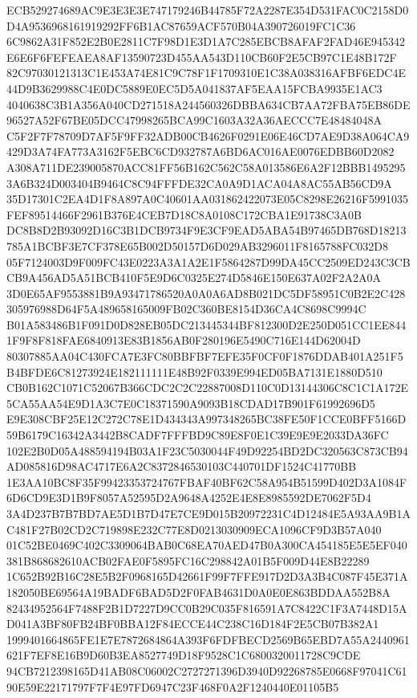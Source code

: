 \documentclass[UTF8,fontset=fandol,zihao=-4,a4paper]{ctexart}
\begin{document}
{{ECB529274689AC9E3E3E3E747179246B44785F72A2287E354D531FAC0C2158D0D4A9536968161919292FF6B1AC87659ACF570B04A390726019FC1C36
6C9862A31F852E2B0E2811C7F98D1E3D1A7C285EBCB8AFAF2FAD46E945342E6E6F6FEFEAEA8AF13590723D455AA543D110CB60F2E5CB97C1E48B172F
82C97030121313C1E453A74E81C9C78F1F1709310E1C38A038316AFBF6EDC4E44D9B3629988C4E0DC5889E0EC5D5A041837AF5EAA15FCBA9935E1AC3
4040638C3B1A356A040CD271518A244560326DBBA634CB7AA72FBA75EB86DE96527A52F67BE05DCC47998265BCA99C1603A32A36AECCC7E48484048A
C5F2F7F78709D7AF5F9FF32ADB00CB4626F0291E06E46CD7AE9D38A064CA9429D3A74FA773A3162F5EBC6CD932787A6BD6AC016AE0076EDBB60D2082
A308A711DE239005870ACC81FF56B162C562C58A013586E6A2F12BBB14952953A6B324D003404B9464C8C94FFFDE32CA0A9D1ACA04A8AC55AB56CD9A
35D17301C2EA4D1F8A897A0C40601AA031862422073E05C8298E26216F5991035FEF89514466F2961B376E4CEB7D18C8A0108C172CBA1E91738C3A0B
DC8B8D2B93092D16C3B1DCB9734F9E3CF9EAD5ABA54B97465DB768D18213785A1BCBF3E7CF378E65B002D50157D6D029AB3296011F8165788FC032D8
05F7124003D9F009FC43E0223A3A1A2E1F5864287D99DA45CC2509ED243C3CBCB9A456AD5A51BCB410F5E9D6C0325E274D5846E150E637A02F2A2A0A
3D0E65AF9553881B9A93471786520A0A0A6AD8B021DC5DF58951C0B2E2C428305976988D64F5A489658165009FB02C360BE8154D36CA4C8698C9994C
B01A583486B1F091D0D828EB05DC213445344BF812300D2E250D051CC1EE8441F9F8F818FAE6840913E83B1856AB0F280196E5490C716E144D62004D
80307885AA04C430FCA7E3FC80BBFBF7EFE35F0CF0F1876DDAB401A251F5B4BFDE6C81273924E182111111E48B92F0339E994ED05BA7131E1880D510
CB0B162C1071C52067B366CDC2C2C22887008D110C0D13144306C8C1C1A172E5CA55AA54E9D1A3C7E0C18371590A9093B18CDAD17B901F61992696D5
E9E308CBF25E12C272C78E1D434343A997348265BC38FE50F1CCE0BFF5166D59B6179C16342A3442B8CADF7FFFBD9C89E8F0E1C39E9E9E2033DA36FC
102E2B0D05A488594194B03A1F23C5030044F49D92254BD2DC320563C873CB94AD085816D98AC4717E6A2C8372846530103C440701DF1524C41770BB
1E3AA10BC8F35F99423353724767FBAF40BF62C58A954B51599D402D3A1084F6D6CD9E3D1B9F8057A52595D2A9648A4252E4E8E8985592DE7062F5D4
3A4D237B7B7BD7AE5D1B7D47E7CE9D015B20972231C4D12484E5A93AA9B1AC481F27B02CD2C719898E232C77E8D0213030909ECA1096CF9D3B57A040
01C52BE0469C402C3309064BAB0C68EA70AED47B0A300CA454185E5E5EF040381B868682610ACB02FAE0F5895FC16C298842A01B5F009D44E8B22289
1C652B92B16C28E5B2F0968165D42661F99F7FFE917D2D3A3B4C087F45E371A182050BE69564A19BADF6BAD5D2F0FAB4631D0A0E0E863BDDAA552B8A
82434952564F7488F2B1D7227D9CC0B29C035F816591A7C8422C1F3A7448D15AD041A3BF80FB24BF0BBA12F84ECCE44C238C16D184F2E5CB07B382A1
1999401664865FE1E7E7872684864A393F6FDFBECD2569B65EBD7A55A2440961621F7EF8E16B9D60B3EA8527749D18F9528C1C6800320011728C9CDE
94CB7212398165D41AB08C06002C2727271396D3940D92268785E0668F97041C6190E59E22171797F7F4E97FD6947C23F468F0A2F1240440E01105B5
}}
\end{document}
